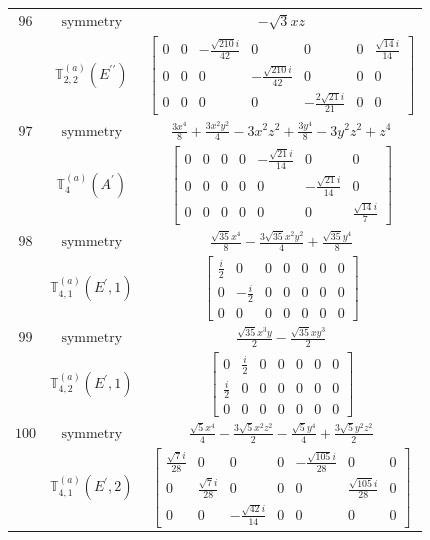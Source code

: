 \documentclass[fleqn,8pt,landscape]{jsarticle}
\begin{document}
\begin{longtable}{ccc}
$ 96 $ & $ \text{symmetry} $ & $ - \sqrt{3} x z $ \\
$  $ & $ \mathbb{T}_{2,2}^{(a)}(E^{\prime\prime}) $ & $ \begin{bmatrix} 0 & 0 & - \frac{\sqrt{210} i}{42} & 0 & 0 & 0 & \frac{\sqrt{14} i}{14} \\ 0 & 0 & 0 & - \frac{\sqrt{210} i}{42} & 0 & 0 & 0 \\ 0 & 0 & 0 & 0 & - \frac{2 \sqrt{21} i}{21} & 0 & 0 \end{bmatrix} $ \\ \hline
$ 97 $ & $ \text{symmetry} $ & $ \frac{3 x^{4}}{8} + \frac{3 x^{2} y^{2}}{4} - 3 x^{2} z^{2} + \frac{3 y^{4}}{8} - 3 y^{2} z^{2} + z^{4} $ \\
$  $ & $ \mathbb{T}_{4}^{(a)}(A^{\prime}) $ & $ \begin{bmatrix} 0 & 0 & 0 & 0 & - \frac{\sqrt{21} i}{14} & 0 & 0 \\ 0 & 0 & 0 & 0 & 0 & - \frac{\sqrt{21} i}{14} & 0 \\ 0 & 0 & 0 & 0 & 0 & 0 & \frac{\sqrt{14} i}{7} \end{bmatrix} $ \\ \hline
$ 98 $ & $ \text{symmetry} $ & $ \frac{\sqrt{35} x^{4}}{8} - \frac{3 \sqrt{35} x^{2} y^{2}}{4} + \frac{\sqrt{35} y^{4}}{8} $ \\
$  $ & $ \mathbb{T}_{4,1}^{(a)}(E^{\prime},1) $ & $ \begin{bmatrix} \frac{i}{2} & 0 & 0 & 0 & 0 & 0 & 0 \\ 0 & - \frac{i}{2} & 0 & 0 & 0 & 0 & 0 \\ 0 & 0 & 0 & 0 & 0 & 0 & 0 \end{bmatrix} $ \\ \hline
$ 99 $ & $ \text{symmetry} $ & $ \frac{\sqrt{35} x^{3} y}{2} - \frac{\sqrt{35} x y^{3}}{2} $ \\
$  $ & $ \mathbb{T}_{4,2}^{(a)}(E^{\prime},1) $ & $ \begin{bmatrix} 0 & \frac{i}{2} & 0 & 0 & 0 & 0 & 0 \\ \frac{i}{2} & 0 & 0 & 0 & 0 & 0 & 0 \\ 0 & 0 & 0 & 0 & 0 & 0 & 0 \end{bmatrix} $ \\ \hline
$ 100 $ & $ \text{symmetry} $ & $ \frac{\sqrt{5} x^{4}}{4} - \frac{3 \sqrt{5} x^{2} z^{2}}{2} - \frac{\sqrt{5} y^{4}}{4} + \frac{3 \sqrt{5} y^{2} z^{2}}{2} $ \\
$  $ & $ \mathbb{T}_{4,1}^{(a)}(E^{\prime},2) $ & $ \begin{bmatrix} \frac{\sqrt{7} i}{28} & 0 & 0 & 0 & - \frac{\sqrt{105} i}{28} & 0 & 0 \\ 0 & \frac{\sqrt{7} i}{28} & 0 & 0 & 0 & \frac{\sqrt{105} i}{28} & 0 \\ 0 & 0 & - \frac{\sqrt{42} i}{14} & 0 & 0 & 0 & 0 \end{bmatrix} $ \\ \hline

\end{longtable}
\end{document}
